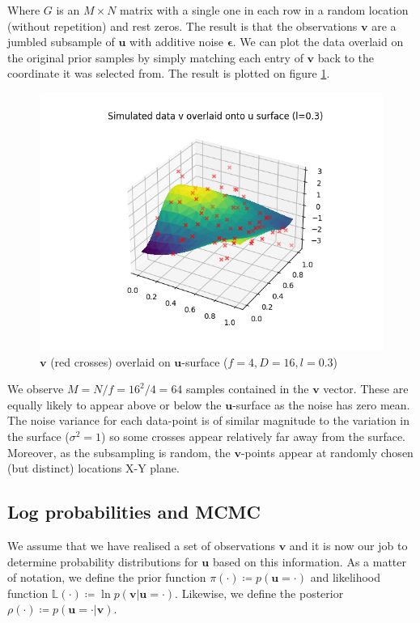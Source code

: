 \documentclass[]{article}
\newcommand{\figwidth}{0.6\linewidth}
\newcommand{\lik}{\mathbb{L}}
\newcommand{\ubold}{\boldsymbol{u}}
\newcommand{\vbold}{\boldsymbol{v}}
\newcommand{\epsbold}{\boldsymbol{\epsilon}}
\begin{document}
Where $G$ is an $M \times N$ matrix with a single one in each row in a random location (without repetition) and rest zeros. The result is that the observations $\vbold$ are a jumbled subsample of $\ubold$ with additive noise $\epsbold$. We can plot the data overlaid on the original prior samples by simply matching each entry of $\vbold$ back to the coordinate it was selected from. The result is plotted on figure \ref{fig:v-on-u}.
%
\begin{figure}[!h]
	\centering
	\includegraphics[width=\figwidth]{v-overlay.png}
	\caption{$\vbold$ (red crosses) overlaid on $\ubold$-surface ($f=4, D=16, l=0.3$)}
	\label{fig:v-on-u}
\end{figure}

We observe $M=N/f=16^2/4=64$ samples contained in the $\vbold$ vector. These are equally likely to appear above or below the $\ubold$-surface as the noise has zero mean. The noise variance for each data-point is of similar magnitude to the variation in the surface ($\sigma^2 = 1$) so some crosses appear relatively far away from the surface. Moreover, as the subsampling is random, the $\vbold$-points appear at randomly chosen (but distinct) locations X-Y plane.

\subsection{Log probabilities and MCMC}

We assume that we have realised a set of observations $\vbold$ and it is now our job to determine probability distributions for $\ubold$ based on this information. As a matter of notation, we define the prior function $\pi(\cdot) \coloneqq p(\ubold=\cdot)$ and likelihood function $\lik(\cdot) \coloneqq \ln p (\vbold | \ubold = \cdot)$. Likewise, we define the posterior $\rho(\cdot) \coloneqq p(\ubold=\cdot | \vbold)$.
\end{document}

